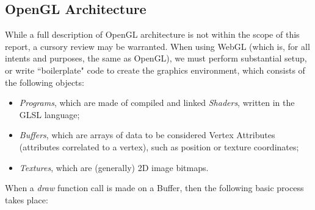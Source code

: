 \subsection{OpenGL Architecture}
While a full description of OpenGL architecture is not within the scope of this report, a cursory review may be warranted. When using WebGL (which is, for all intents and purposes, the same as OpenGL), we must perform substantial setup, or write ``boilerplate" code to create the graphics environment, which consists of the following objects:
\begin{itemize}
    \item \emph{Programs}, which are made of compiled and linked \emph{Shaders}, written in the GLSL language;
    \item \emph{Buffers}, which are arrays of data to be considered Vertex Attributes (attributes correlated to a vertex), such as position or texture coordinates;
    \item \emph{Textures}, which are (generally) 2D image bitmaps.
\end{itemize}
\par When a \emph{draw} function call is made on a Buffer, then the following basic process takes place:
